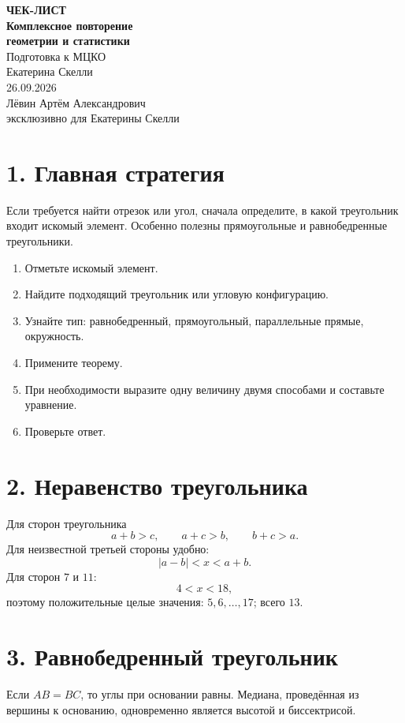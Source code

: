 \documentclass[a4paper,12pt]{article}
\begin{document}
\begin{titlepage}
\centering
\vspace*{30mm}
{\color{darkaccent}\Large\bfseries ЧЕК-ЛИСТ}\\[7mm]
{\Huge\bfseries Комплексное повторение\\[2mm]геометрии и статистики}\\[5mm]
{\Large Подготовка к МЦКО}\\[20mm]
{\large Екатерина Скелли}\\
\vfill
{\large 26.09.2026}\\[8mm]
{\small Лёвин Артём Александрович\\эксклюзивно для Екатерины Скелли}
\end{titlepage}

\section*{\color{darkaccent}1. Главная стратегия}
Если требуется найти отрезок или угол, сначала определите, в какой треугольник входит искомый элемент. Особенно полезны прямоугольные и равнобедренные треугольники.
\begin{enumerate}
\item Отметьте искомый элемент.
\item Найдите подходящий треугольник или угловую конфигурацию.
\item Узнайте тип: равнобедренный, прямоугольный, параллельные прямые, окружность.
\item Примените теорему.
\item При необходимости выразите одну величину двумя способами и составьте уравнение.
\item Проверьте ответ.
\end{enumerate}

\section*{\color{darkaccent}2. Неравенство треугольника}
Для сторон треугольника
\[
a+b>c,\qquad a+c>b,\qquad b+c>a.
\]
Для неизвестной третьей стороны удобно:
\[
\boxed{|a-b|<x<a+b}.
\]
Для сторон $7$ и $11$:
\[
4<x<18,
\]
поэтому положительные целые значения: $5,6,\ldots,17$; всего $13$.

\section*{\color{darkaccent}3. Равнобедренный треугольник}
Если $AB=BC$, то углы при основании равны. Медиана, проведённая из вершины к основанию, одновременно является высотой и биссектрисой.
\end{document}
